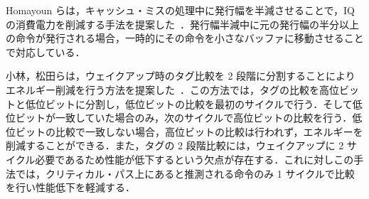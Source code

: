 Homayoun らは，キャッシュ・ミスの処理中に発行幅を半減させることで，IQ の消費電力を削減する手法を提案した~\cite{H.Homayoun2011}．発行幅半減中に元の発行幅の半分以上の命令が発行される場合，一時的にその命令を小さなバッファに移動させることで対応している．

小林，松田らは，ウェイクアップ時のタグ比較を 2 段階に分割することによりエネルギー削減を行う方法を提案した~\cite{kobayashi-thesis, matsuda-thesis}．この方法では，タグの比較を高位ビットと低位ビットに分割し，低位ビットの比較を最初のサイクルで行う．そして低位ビットが一致していた場合のみ，次のサイクルで高位ビットの比較を行う．低位ビットの比較で一致しない場合，高位ビットの比較は行われず，エネルギーを削減することができる．また，タグの 2 段階比較には，ウェイクアップに 2 サイクル必要であるため性能が低下するという欠点が存在する．これに対しこの手法では，クリティカル・パス上にあると推測される命令のみ 1 サイクルで比較を行い性能低下を軽減する．


